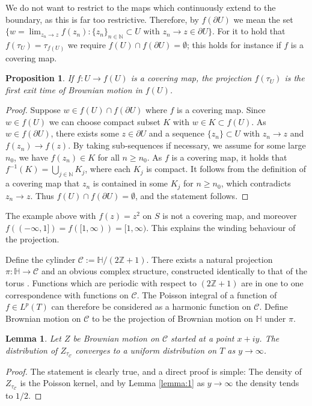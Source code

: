 \documentclass[a4paper, oneside, 12pt]{amsart}
\newtheorem{lemma}{Lemma}
\newtheorem{proposition}{Proposition}
\newcommand{\mc}{\mathcal}
\newcommand{\Z}{\mathbb{Z}}
\newcommand{\N}{\mathbb{N}}
\renewcommand{\H}{\mathbb{H}}
\begin{document}
We do not want to restrict to the maps which continuously extend to the boundary, as this is far too restrictive. 
Therefore, by $f(\partial U)$ we mean the set $\{w = \lim_{z_n\to z} f(z_n):
\{z_n\}_{n\in\N}\subset U \text{ with }z_n\to z\in \partial U \}$.
For it to hold that $f(\tau_U)=\tau_{f(U)}$ we require $f(U) \cap f(\partial U) = \emptyset$; this holds for instance if $f$ is a covering
map.

\begin{proposition}\label{covering}
	If $f:U\to f(U)$ is a covering map, the projection $f(\tau_U)$ is the first exit time of Brownian motion in 
	$f(U)$.
\end{proposition}
\begin{proof}
	Suppose $w \in f(U) \cap f(\partial U)$ where $f$ is a covering map. 
	Since $w\in f(U)$ we can choose compact subset $K$ with 
	$w\in K\subset f(U)$. As $w \in f(\partial U)$, there exists some $z\in\partial U$  and a sequence 
	$\{z_n\}\subset U$ with $z_n\to z$ and $f(z_n) \to f(z)$. By taking sub-sequences if necessary, we assume
	for some large $n_0$,
	we have $f(z_n) \in K$ for all $n\geq n_0$. As $f$ is a covering map, it holds that
	$f^{-1}(K) = \bigcup_{j\in \N} K_j$, where each $K_j$ 
	is compact. It follows from the definition of a covering map that $z_n$ is 
	contained in some $K_j$ for $n\geq n_0$, which contradicts $z_n \to z$.
	Thus $f(U) \cap f(\partial U) = \emptyset$, and the statement follows.
\end{proof}
The example above with $f(z) = z^2$ on $S$ is not a covering map, and
moreover $f((-\infty, 1]) = f([1,\infty)) =[1,\infty)$. This explains the winding behaviour of the projection.


Define the cylinder $\mc{C} := \H / (2\Z+1)$. There exists a natural projection $\pi:\H \to \mc{C}$ and an obvious 
complex structure, constructed identically to that of the torus \cite{Otto}. Functions which are periodic with respect to $(2\Z+1)$
are in one to one correspondence with functions on $\mc{C}$. The Poisson integral of a function of $f\in L^p(T)$ can therefore be 
considered as a harmonic function on $\mc{C}$. Define Brownian motion
on $\mc{C}$ to be the projection of Brownian motion on $\H$ under $\pi$.
\begin{lemma}\label{lemma:3}
	Let $Z$ be Brownian motion on $\mc{C}$ started at a point $x+iy$. The distribution of $Z_{\tau_{\mc{C}}}$
	converges to a uniform distribution on $T$ as $y\to\infty$.
\end{lemma}
\begin{proof}
	The statement is clearly true, and a direct proof is simple: The density of $Z_{\tau_{\mc{C}}}$ is the Poisson kernel, and by
	Lemma \ref{lemma:1} as $y\to\infty$ the density tends to $1/2$.
\end{proof}
\end{document}
